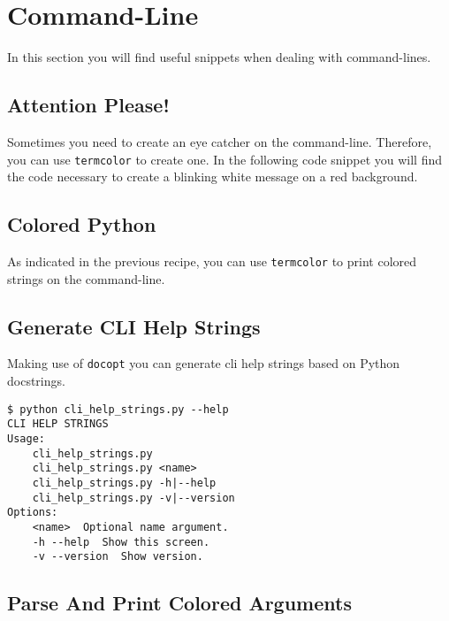 
\section{Command-Line}

In this section you will find useful snippets when dealing with command-lines.

\subsection{Attention Please!}

Sometimes you need to create an eye catcher on the command-line.
Therefore, you can use \lstinline{termcolor} to create one.
In the following code snippet you will find the code necessary to create a blinking white message on a red background.




\subsection{Colored Python}

As indicated in the previous recipe, you can use \lstinline{termcolor} to print colored strings on the command-line.




\subsection{Generate CLI Help Strings}

Making use of \lstinline{docopt} you can generate cli help strings based on Python docstrings.



\begin{lstlisting}[caption=Output of cli\_help\_string.py]
$ python cli_help_strings.py --help
CLI HELP STRINGS
Usage:
    cli_help_strings.py
    cli_help_strings.py <name>
    cli_help_strings.py -h|--help
    cli_help_strings.py -v|--version
Options:
    <name>  Optional name argument.
    -h --help  Show this screen.
    -v --version  Show version.
\end{lstlisting}


\subsection{Parse And Print Colored Arguments}

